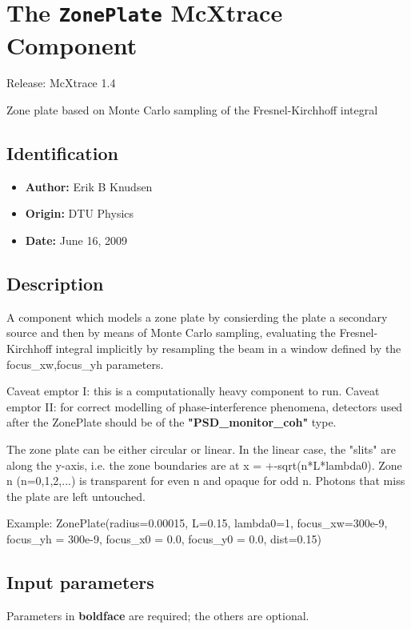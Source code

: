 \section{The \texttt{ZonePlate} McXtrace Component}
Release: McXtrace 1.4

Zone plate based on Monte Carlo sampling of the Fresnel-Kirchhoff integral

\subsection*{Identification}
\begin{itemize}
  \item \textbf{Author:} Erik B Knudsen
  \item \textbf{Origin:} DTU Physics
  \item \textbf{Date:} June 16, 2009
\end{itemize}

\subsection*{Description}
A component which models a zone plate by consierding the plate a secondary source and then by means of Monte Carlo sampling, evaluating the Fresnel-Kirchhoff integral implicitly by resampling the beam in a window defined by the focus\_xw,focus\_yh parameters.

Caveat emptor I: this is a computationally heavy component to run. Caveat emptor II: for correct modelling of phase-interference phenomena, detectors used after the ZonePlate should be of the \textbf{"PSD\_monitor\_coh"} type.

The zone plate can be either circular or linear. In the linear case, the "slits" are along the y-axis, i.e. the zone boundaries are at x = +-sqrt(n*L*lambda0). Zone n (n=0,1,2,...) is transparent for even n and opaque for odd n. Photons that miss the plate are left untouched.

Example: ZonePlate(radius=0.00015, L=0.15, lambda0=1, focus\_xw=300e-9, focus\_yh = 300e-9, focus\_x0 = 0.0, focus\_y0 = 0.0, dist=0.15)

\subsection*{Input parameters}
Parameters in \textbf{boldface} are required; the others are optional.

